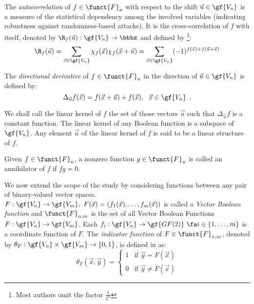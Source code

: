 The \textsl{autocorrelation} of $f \in \funct{F}_n$ with respect to the shift
$\vec{u} \in \gf{V_n}$ is a measure of the statistical
  dependency among the involved variables (indicating robustness against
  randomness-based attacks). It is the cross-correlation 
  of $f$ with itself, denoted by 
$\R_{f}(\vec{u}): \gf{V_n} \to \bbbz$ and defined by \footnote{Most authors omit the factor $\frac{1}{2^n}$}: 
\begin{equation}
\R_f(\vec{u}) = \sum_{\vec{x} \in \gf{V_n}} \chi_f(\vec{x})
\chi_f(\vec{x}+\vec{u}) = \sum_{\vec{x} \in \gf{V_n}} (-1)^{f(\vec{x})+f(\vec{u}+\vec{x})}
\end{equation}

The \textsl{directional derivative} of $f \in \funct{F}_n$ in the direction of $\vec{u} \in \gf{V_n}$ is defined by:
\begin{equation}
    \Delta_{\vec{u}}f(\vec{x}) = f(\vec{x}+\vec{u}) + f(\vec{x}), \  \  \vec{x} \in \gf{V_n} \enspace .
\end{equation}

We shall call the linear kernel of $f$ the set of those vectors $\vec{u}$ such that $\Delta_{\vec{u}}f$ is a constant function.
The linear kernel of any Boolean function is a subspace of $\gf{V_n}$. Any element $\vec{u}$ of the linear kernel of $f$ is said 
to be a linear structure of $f$.

Given  $f \in \funct{F}_n$, a nonzero function $g \in \funct{F}_n$ is called
an annihilator of $f$ if $fg = 0$.

We now extend the scope of the study by considering functions
  between any pair of binary-valued vector spaces.
$F: \gf{V_n} \to \gf{V_m}, \ F(\vec{x}) = (f_1(\vec{x}),\dots,f_{m}(\vec{x}))$
is called a \textsl{Vector Boolean function} and $\funct{F}_{n,m}$ is the set
of all Vector Boolean Functions $F:\gf{V_n} \to \gf{V_m}$. Each $f_i: \gf{V_n}
\to \gf{GF(2)} \ \fa i \in \{1, \ldots, m \}$ is a coordinate function of
$F$. The \textsl{indicator function} of $F \in \funct{F}_{n,m}$, denoted by
$\theta_F : \gf{V_n} \times \gf{V_m} \to \left\{0,1\right\}$, 
is defined in \cite{ChabaudV:94} as:
\begin{equation}\label{IndicatorFunction}
    \theta_F(\vec{x},\vec{y}) = \left\{
	\begin{array}{ll}
		1 & \mbox{if }\vec{y}=F(\vec{x}) \\
		0 & \mbox{if }\vec{y} \neq F(\vec{x})
	\end{array}
\right.
\end{equation}

